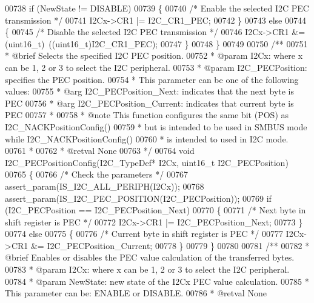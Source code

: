 \begin{DoxyCode}
00738   \textcolor{keywordflow}{if} (NewState != DISABLE)
00739   \{
00740     \textcolor{comment}{/* Enable the selected I2C PEC transmission */}
00741     I2Cx->CR1 |= I2C_CR1_PEC;
00742   \}
00743   \textcolor{keywordflow}{else}
00744   \{
00745     \textcolor{comment}{/* Disable the selected I2C PEC transmission */}
00746     I2Cx->CR1 &= (uint16\_t)~((uint16\_t)I2C_CR1_PEC);
00747   \}
00748 \}
00749 
00750 \textcolor{comment}{/**}
00751 \textcolor{comment}{  * @brief  Selects the specified I2C PEC position.}
00752 \textcolor{comment}{  * @param  I2Cx: where x can be 1, 2 or 3 to select the I2C peripheral.}
00753 \textcolor{comment}{  * @param  I2C\_PECPosition: specifies the PEC position. }
00754 \textcolor{comment}{  *          This parameter can be one of the following values:}
00755 \textcolor{comment}{  *            @arg I2C\_PECPosition\_Next: indicates that the next byte is PEC}
00756 \textcolor{comment}{  *            @arg I2C\_PECPosition\_Current: indicates that current byte is PEC}
00757 \textcolor{comment}{  *       }
00758 \textcolor{comment}{  * @note    This function configures the same bit (POS) as I2C\_NACKPositionConfig()}
00759 \textcolor{comment}{  *          but is intended to be used in SMBUS mode while I2C\_NACKPositionConfig() }
00760 \textcolor{comment}{  *          is intended to used in I2C mode.}
00761 \textcolor{comment}{  *                }
00762 \textcolor{comment}{  * @retval None}
00763 \textcolor{comment}{  */}
00764 \textcolor{keywordtype}{void} I2C_PECPositionConfig(I2C\_TypeDef* I2Cx, uint16\_t I2C\_PECPosition)
00765 \{
00766   \textcolor{comment}{/* Check the parameters */}
00767   assert_param(IS\_I2C\_ALL\_PERIPH(I2Cx));
00768   assert_param(IS\_I2C\_PEC\_POSITION(I2C\_PECPosition));
00769   \textcolor{keywordflow}{if} (I2C\_PECPosition == I2C_PECPosition_Next)
00770   \{
00771     \textcolor{comment}{/* Next byte in shift register is PEC */}
00772     I2Cx->CR1 |= I2C_PECPosition_Next;
00773   \}
00774   \textcolor{keywordflow}{else}
00775   \{
00776     \textcolor{comment}{/* Current byte in shift register is PEC */}
00777     I2Cx->CR1 &= I2C_PECPosition_Current;
00778   \}
00779 \}
00780 
00781 \textcolor{comment}{/**}
00782 \textcolor{comment}{  * @brief  Enables or disables the PEC value calculation of the transferred bytes.}
00783 \textcolor{comment}{  * @param  I2Cx: where x can be 1, 2 or 3 to select the I2C peripheral.}
00784 \textcolor{comment}{  * @param  NewState: new state of the I2Cx PEC value calculation.}
00785 \textcolor{comment}{  *          This parameter can be: ENABLE or DISABLE.}
00786 \textcolor{comment}{  * @retval None}

\end{DoxyCode}
